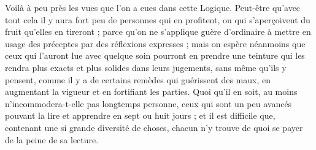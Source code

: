 Voilà à peu près les vues que l'on a eues dans cette Logique. Peut-être qu'avec tout cela il y aura fort peu de personnes qui en profitent, ou qui s'aperçoivent du fruit qu'elles en tireront ; parce qu'on ne s'applique guère d'ordinaire à mettre en usage des préceptes par des réflexions expresses ; mais on espère néanmoins que ceux qui l'auront lue avec quelque soin pourront en prendre une teinture qui les rendra plus exacts et plus solides dans leurs jugements, sans même qu'ils y pensent, comme il y a de certains remèdes qui guérissent des maux, en augmentant la vigueur et en fortifiant les parties. Quoi qu'il en soit, au moins n'incommodera-t-elle pas longtemps personne, ceux qui sont un peu avancés pouvant la lire et apprendre en sept ou huit jours ; et il est difficile que, contenant une si grande diversité de choses, chacun n'y trouve de quoi se payer de la peine de sa lecture.
